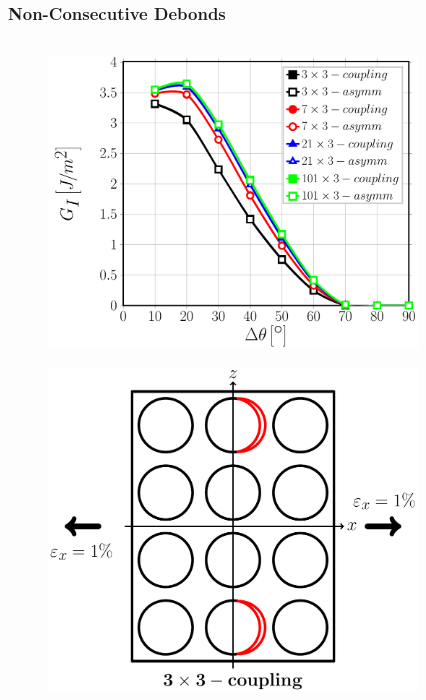 \documentclass[first,firstsupp,lastsupp,last,hyperref,table]{ETHclass}
\begin{document}
\begin{frame}
\frametitle{\vspace{0.3cm}\small Non-Consecutive Debonds}
\vspace{-0.9cm}
\centering
\begin{columns}
\centering
\begin{column}{0.5\textwidth}
\centering
\begin{figure}
\centering
\includegraphics[width=\columnwidth]{nxk-coupling-vf60-GI.pdf}
\end{figure}
\vspace{-0.8cm}
\begin{figure}
\centering
\includegraphics[width=0.5\columnwidth]{twofibersbetweendebonds-sameside-dtheta80.pdf}
\end{figure}
\end{column}
\begin{column}{0.5\textwidth}
\centering
\begin{figure}
\centering

\end{figure}
\end{column}
\end{columns}
\end{frame}
\end{document}
